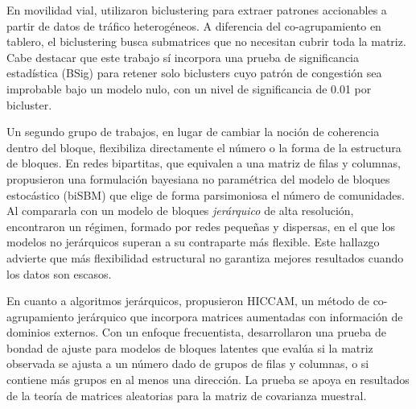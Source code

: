 En movilidad vial, \cite{Neves2022} utilizaron biclustering para extraer
patrones accionables a partir de datos de tráfico heterogéneos. A diferencia
del co-agrupamiento en tablero, el biclustering busca submatrices que no
necesitan cubrir toda la matriz. Cabe destacar que este trabajo sí
incorpora una prueba de significancia estadística (BSig) para retener solo
biclusters cuyo patrón de congestión sea improbable bajo un modelo nulo,
con un nivel de significancia de 0.01 por bicluster.

Un segundo grupo de trabajos, en lugar de cambiar la noción de coherencia
dentro del bloque, flexibiliza directamente el número o la forma de la
estructura de bloques. En redes bipartitas, que equivalen a una matriz de
filas y columnas, \cite{Yen2020} propusieron una formulación bayesiana no
paramétrica del modelo de bloques estocástico (biSBM) que elige de forma
parsimoniosa el número de comunidades. Al compararla con un modelo de
bloques \emph{jerárquico} de alta resolución, encontraron un régimen,
formado por redes pequeñas y dispersas, en el que los modelos no
jerárquicos superan a su contraparte más flexible. Este hallazgo advierte
que más flexibilidad estructural no garantiza mejores resultados cuando los
datos son escasos.

En cuanto a algoritmos jerárquicos, \cite{Sugahara2023} propusieron HICCAM,
un método de co-agrupamiento jerárquico que incorpora matrices aumentadas
con información de dominios externos. Con un enfoque frecuentista,
\cite{Watanabe2021gof} desarrollaron una prueba de bondad de ajuste para
modelos de bloques latentes que evalúa si la matriz observada se ajusta a un
número dado de grupos de filas y columnas, o si contiene más grupos en al
menos una dirección. La prueba se apoya en resultados de la teoría de
matrices aleatorias para la matriz de covarianza muestral.

